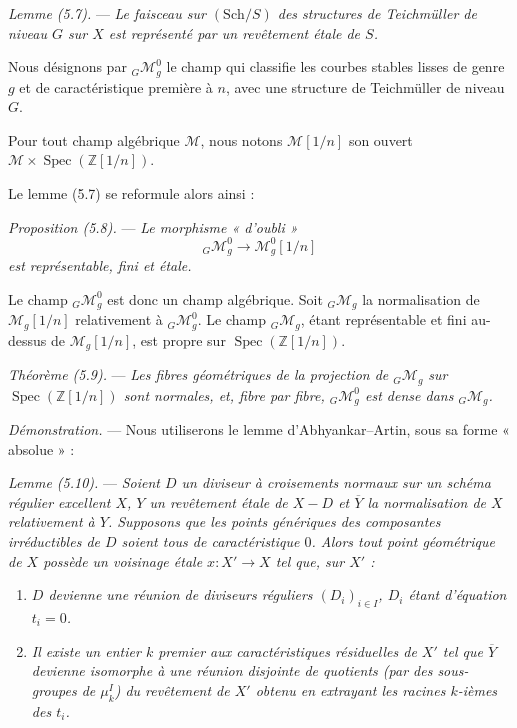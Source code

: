 \documentclass[10pt]{article}
\newcommand{\Spec}{\operatorname{Spec}}
\begin{document}
\medskip
\noindent\emph{Lemme (5.7).} --- \emph{Le faisceau sur $(\mathrm{Sch}/S)$ des structures de Teichmüller de niveau $G$ sur $X$ est représenté par un revêtement étale de $S$.}

Nous désignons par ${}_G\mathcal M_g^0$ le champ qui classifie les courbes stables lisses de genre $g$ et de caractéristique première à $n$, avec une structure de Teichmüller de niveau $G$.

Pour tout champ algébrique $\mathscr M$, nous notons $\mathscr M[1/n]$ son ouvert $\mathscr M\times\Spec(\mathbb Z[1/n])$.

Le lemme (5.7) se reformule alors ainsi :

\medskip
\noindent\emph{Proposition (5.8).} --- \emph{Le morphisme « d'oubli »}
\[
{}_G\mathcal M_g^0\longrightarrow \mathcal M_g^0[1/n]
\]
\emph{est représentable, fini et étale.}

Le champ ${}_G\mathcal M_g^0$ est donc un champ algébrique. Soit ${}_G\mathcal M_g$ la normalisation de $\mathcal M_g[1/n]$ relativement à ${}_G\mathcal M_g^0$. Le champ ${}_G\mathcal M_g$, étant représentable et fini au-dessus de $\mathcal M_g[1/n]$, est propre sur $\Spec(\mathbb Z[1/n])$.

\medskip
\noindent\emph{Théorème (5.9).} --- \emph{Les fibres géométriques de la projection de ${}_G\mathcal M_g$ sur $\Spec(\mathbb Z[1/n])$ sont normales, et, fibre par fibre, ${}_G\mathcal M_g^0$ est dense dans ${}_G\mathcal M_g$.}

\noindent\emph{Démonstration.} --- Nous utiliserons le lemme d'Abhyankar--Artin, sous sa forme « absolue » :

\medskip
\noindent\emph{Lemme (5.10).} --- \emph{Soient $D$ un diviseur à croisements normaux sur un schéma régulier excellent $X$, $Y$ un revêtement étale de $X-D$ et $\overline Y$ la normalisation de $X$ relativement à $Y$. Supposons que les points génériques des composantes irréductibles de $D$ soient tous de caractéristique $0$. Alors tout point géométrique de $X$ possède un voisinage étale $x:X'\to X$ tel que, sur $X'$ :}
\begin{enumerate}[label=(\roman*)]
\item \emph{$D$ devienne une réunion de diviseurs réguliers $(D_i)_{i\in I}$, $D_i$ étant d'équation $t_i=0$.}
\item \emph{Il existe un entier $k$ premier aux caractéristiques résiduelles de $X'$ tel que $\overline Y$ devienne isomorphe à une réunion disjointe de quotients (par des sous-groupes de $\mu_k^I$) du revêtement de $X'$ obtenu en extrayant les racines $k$-ièmes des $t_i$.}
\end{enumerate}
\end{document}
